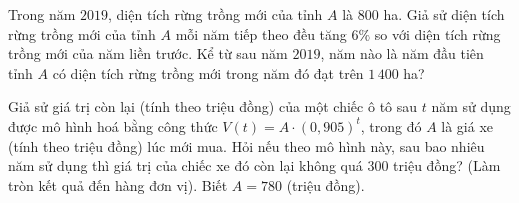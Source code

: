 \begin{bt}%

    Trong năm $2019$, diện tích rừng trồng mới của tỉnh $A$ là $800$ ha. Giả sử diện tích rừng trồng mới của tỉnh $A$ mỗi năm tiếp theo đều tăng   $6\%$ so với diện tích rừng trồng mới của năm liền trước. Kể từ sau năm  $2019$, năm nào là năm đầu tiên tỉnh $A$ có diện tích rừng trồng mới trong năm đó đạt trên  $1\,400$ ha?
\end{bt}

\begin{bt}%

    Giả sử giá trị còn lại (tính theo triệu đồng) của một chiếc ô tô sau $t$ năm sử dụng được mô hình hoá bằng công thức $V(t)=A \cdot(0{,}905)^t$, trong đó $A$ là giá xe (tính theo triệu đồng) lúc mới mua. Hỏi nếu theo mô hình này, sau bao nhiêu năm sử dụng thì giá trị của chiếc xe đó còn lại không quá $300$ triệu đồng? (Làm tròn kết quả đến hàng đơn vị). Biết $A=780$ (triệu đồng).
\end{bt}

